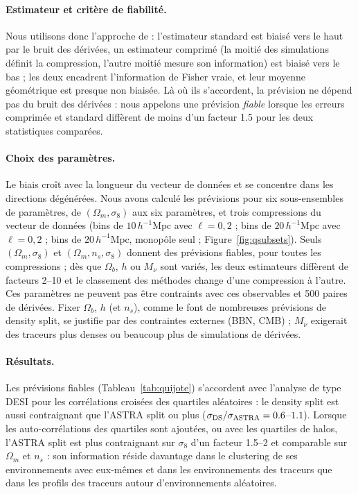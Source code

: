 \documentclass[11pt,twocolumn]{article}
\newcommand{\Mpch}{\,h^{-1}\mathrm{Mpc}}
\begin{document}
\paragraph{Estimateur et critère de fiabilité.} Nous utilisons donc l'approche de \cite{CoultonWandelt2023} : l'estimateur standard est biaisé vers le haut par le bruit des dérivées, un estimateur comprimé (la moitié des simulations définit la compression, l'autre moitié mesure son information) est biaisé vers le bas ; les deux encadrent l'information de Fisher vraie, et leur moyenne géométrique est presque non biaisée. Là où ils s'accordent, la prévision ne dépend pas du bruit des dérivées : nous appelons une prévision \emph{fiable} lorsque les erreurs comprimée et standard diffèrent de moins d'un facteur 1.5 pour les deux statistiques comparées.

\paragraph{Choix des paramètres.} Le biais croît avec la longueur du vecteur de données et se concentre dans les directions dégénérées. Nous avons calculé les prévisions pour six sous-ensembles de paramètres, de $(\Omega_m,\sigma_8)$ aux six paramètres, et trois compressions du vecteur de données (bins de $10\Mpch$ avec $\ell=0,2$ ; bins de $20\Mpch$ avec $\ell=0,2$ ; bins de $20\Mpch$, monopôle seul ; Figure~\ref{fig:qsubsets}). Seuls $(\Omega_m,\sigma_8)$ et $(\Omega_m,n_s,\sigma_8)$ donnent des prévisions fiables, pour toutes les compressions ; dès que $\Omega_b$, $h$ ou $M_\nu$ sont variés, les deux estimateurs diffèrent de facteurs 2--10 et le classement des méthodes change d'une compression à l'autre. Ces paramètres ne peuvent pas être contraints avec ces observables et 500 paires de dérivées. Fixer $\Omega_b$, $h$ (et $n_s$), comme le font de nombreuses prévisions de density split, se justifie par des contraintes externes (BBN, CMB) ; $M_\nu$ exigerait des traceurs plus denses ou beaucoup plus de simulations de dérivées.

\paragraph{Résultats.} Les prévisions fiables (Tableau~\ref{tab:quijote}) s'accordent avec l'analyse de type DESI pour les corrélations croisées des quartiles aléatoires : le density split est aussi contraignant que l'ASTRA split ou plus ($\sigma_{\rm DS}/\sigma_{\rm ASTRA}=0.6$--$1.1$). Lorsque les auto-corrélations des quartiles sont ajoutées, ou avec les quartiles de halos, l'ASTRA split est plus contraignant sur $\sigma_8$ d'un facteur 1.5--2 et comparable sur $\Omega_m$ et $n_s$ : son information réside davantage dans le clustering de ses environnements avec eux-mêmes et dans les environnements des traceurs que dans les profils des traceurs autour d'environnements aléatoires.
\end{document}
